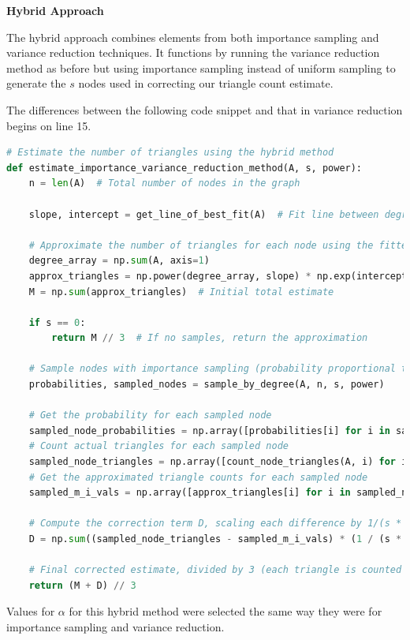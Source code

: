 \documentclass[11pt, margin=1in]{article}
\begin{document}
\textbf{Hybrid Approach}

The hybrid approach combines elements from both importance sampling and variance reduction techniques.
It functions by running the variance reduction method as before but using importance sampling instead of uniform sampling to generate the $s$ nodes used in correcting our triangle count estimate.

The differences between the following code snippet and that in variance reduction begins on line 15.

{
\singlespacing
\begin{lstlisting}[language=Python]
# Estimate the number of triangles using the hybrid method
def estimate_importance_variance_reduction_method(A, s, power):
    n = len(A)  # Total number of nodes in the graph

    slope, intercept = get_line_of_best_fit(A)  # Fit line between degree and triangle count

    # Approximate the number of triangles for each node using the fitted line
    degree_array = np.sum(A, axis=1)
    approx_triangles = np.power(degree_array, slope) * np.exp(intercept)
    M = np.sum(approx_triangles)  # Initial total estimate

    if s == 0:
        return M // 3  # If no samples, return the approximation

    # Sample nodes with importance sampling (probability proportional to degree^power)
    probabilities, sampled_nodes = sample_by_degree(A, n, s, power)

    # Get the probability for each sampled node
    sampled_node_probabilities = np.array([probabilities[i] for i in sampled_nodes])
    # Count actual triangles for each sampled node
    sampled_node_triangles = np.array([count_node_triangles(A, i) for i in sampled_nodes])
    # Get the approximated triangle counts for each sampled node
    sampled_m_i_vals = np.array([approx_triangles[i] for i in sampled_nodes])

    # Compute the correction term D, scaling each difference by 1/(s * probability)
    D = np.sum((sampled_node_triangles - sampled_m_i_vals) * (1 / (s * sampled_node_probabilities)))

    # Final corrected estimate, divided by 3 (each triangle is counted 3 times)
    return (M + D) // 3
\end{lstlisting}
}

Values for $\alpha$ for this hybrid method were selected the same way they were for importance sampling and variance reduction.
\end{document}
